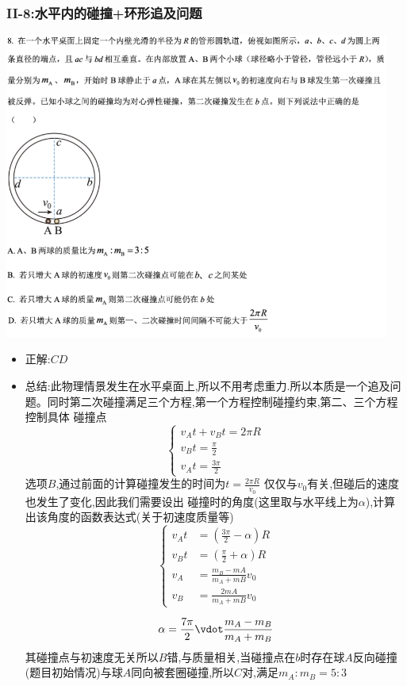 \documentclass{article}
\begin{document}
\vspace{2em}

\subsubsection{II-8:水平内的碰撞+环形追及问题}
\includegraphics[width=0.95\textwidth,keepaspectratio]{./pictures/1.2-3.png}

\begin{itemize}
    \item 正解:\quad $CD$
    \item 总结:\quad 此物理情景发生在水平桌面上,所以不用考虑重力.所以本质是一个追及问题。同时第二次碰撞满足三个方程,第一个方程控制碰撞约束,第二、三个方程控制具体
          碰撞点
          $$
              \begin{cases}
                  v_{A} t + v_{B} t = 2 \pi R \\
                  v_{B} t  = \frac{\pi}{2}    \\
                  v_{A} t = \frac{3\pi}{2}
              \end{cases}
          $$
          选项$B$,通过前面的计算碰撞发生的时间为$t = \frac{2\pi R}{v_{0}}$ 仅仅与$v_{0}$有关,但碰后的速度也发生了变化,因此我们需要设出
          碰撞时的角度(这里取与水平线上为$\alpha$),计算出该角度的函数表达式(关于初速度质量等)
          $$
              \begin{cases}
                  v_{A} t & = (\frac{3\pi}{2} - \alpha) R           \\
                  v_{B} t & = (\frac{\pi}{2} + \alpha) R            \\
                  v_{A}   & = \frac{m_{B} - m{A}}{m_{A}+m{B}} v_{0} \\
                  v_{B}   & = \frac{2 m{A}}{m_{A}+m{B}} v_{0}
              \end{cases}
          $$

          $$
              \alpha = \frac{7 \pi}{2} \vdot \frac{m_{A} - m_{B}}{m_{A} + m_{B}}
          $$
          其碰撞点与初速度无关所以$B$错,与质量相关,当碰撞点在$b$时存在球$A$反向碰撞(题目初始情况)与球$A$同向被套圈碰撞,所以$C$对,满足$m_{A} : m_{B} = 5 : 3$
\end{itemize}
\end{document}
